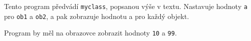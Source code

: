 \begin{mdframed}[style=mdexam]
  \begin{example}\label{cpp:exam002}
    Tento program předvádí \lstinline[basicstyle=\ttfamily]!myclass!, popsanou výše v textu. 
    Nastavuje hodnoty \lstinline[basicstyle=\ttfamily]!a! pro 
    \lstinline[basicstyle=\ttfamily]!ob1! a 
    \lstinline[basicstyle=\ttfamily]!ob2!, a pak zobrazuje hodnotu a pro každý objekt.
    \vspace{1em}       
    
    Program by měl na obrazovce zobrazit hodnoty \lstinline[basicstyle=\ttfamily]!10! a 
    \lstinline[basicstyle=\ttfamily]!99!.
  \end{example}
\end{mdframed}